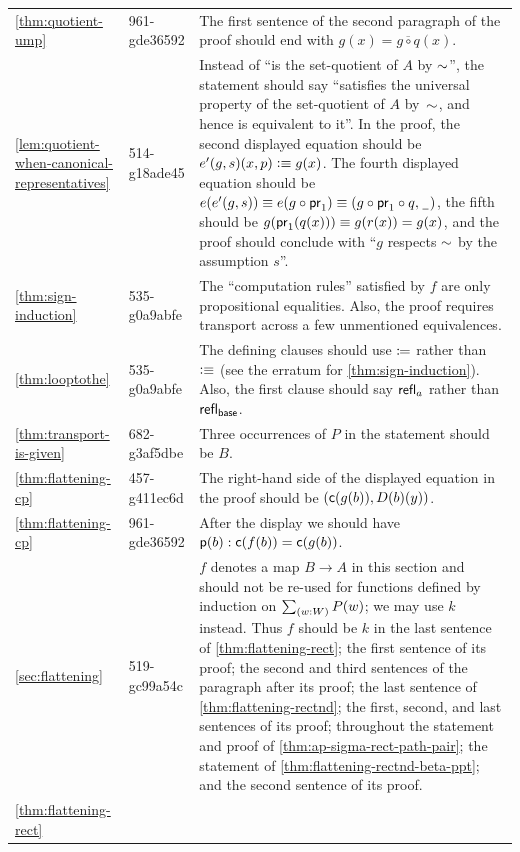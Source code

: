 \documentclass[
%
%
11pt %
]{article}
\begin{document}
\begin{longtable}{llp{10.5cm}}
  \cref{thm:quotient-ump}
  & 961-gde36592
  & The first sentence of the second paragraph of the proof should end with $g(x) = \overline{g\circ q}(x)$.\\
  \cref{lem:quotient-when-canonical-representatives}
  & 514-g18ade45
  & Instead of ``is the set-quotient of $A$ by $\sim$'', the statement should say ``satisfies the universal property of the set-quotient of $A$ by~$\sim$, and hence is equivalent to it''.
  In the proof, the second displayed equation should be $e'(g, s) (x,p) \vcentcolon\equiv g(x)$.
  The fourth displayed equation should be $e(e'(g, s)) \equiv e(g \circ \mathsf{pr}_{1}) \equiv (g \circ \mathsf{pr}_{1} \circ q, {\mathord{\hspace{1pt}\underline{\hspace{1ex}}\hspace{1pt}}})$, the fifth should be $g(\mathsf{pr}_{1}(q(x))) \equiv g(r(x)) = g(x)$, and the proof should conclude with ``$g$ respects $\sim$ by the assumption $s$''.\\
  \cref{thm:sign-induction}
  & 535-g0a9abfe
  & The ``computation rules'' satisfied by $f$ are only propositional equalities.
  Also, the proof requires transport across a few unmentioned equivalences.\\
  \cref{thm:looptothe}
  & 535-g0a9abfe
  & The defining clauses should use $\coloneqq$ rather than $\vcentcolon\equiv$ (see the erratum for \cref{thm:sign-induction}).
  Also, the first clause should say $\mathsf{refl}_{a}$ rather than $\mathsf{refl}_{\mathsf{base}}$.\\
  \cref{thm:transport-is-given}
  & 682-g3af5dbe
  & Three occurrences of $P$ in the statement should be $B$.\\
  \cref{thm:flattening-cp}
  & 457-g411ec6d
  & The right-hand side of the displayed equation in the proof should be $(\mathsf{c}(g(b)),D(b)(y))$.\\
  \cref{thm:flattening-cp}
  & 961-gde36592
  & After the display we should have $\mathsf{p}(b):\mathsf{c}(f(b))=\mathsf{c}(g(b))$.\\
  \cref{sec:flattening}
  & 519-gc99a54c
  & $f$ denotes a map $B\to A$ in this section and should not be re-used for functions defined by induction on $\sm{w:W} P(w)$; we may use $k$ instead.
  Thus $f$ should be $k$ in the last sentence of \cref{thm:flattening-rect}; the first sentence of its proof; the second and third sentences of the paragraph after its proof; the last sentence of \cref{thm:flattening-rectnd}; the first, second, and last sentences of its proof; throughout the statement and proof of \cref{thm:ap-sigma-rect-path-pair}; the statement of \cref{thm:flattening-rectnd-beta-ppt}; and the second sentence of its proof.\\
  \cref{thm:flattening-rect}

\end{longtable}
\end{document}
